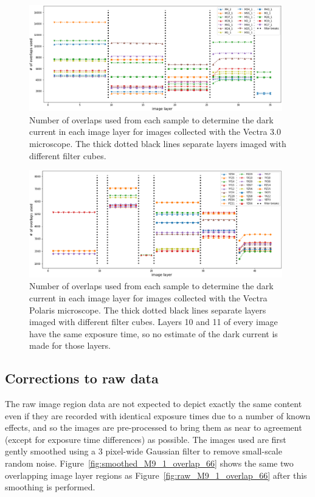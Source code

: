 \documentclass[letterpaper,11pt]{article}
\newcommand{\reffig}[1]{Figure~\ref{#1}}
\begin{document}
\begin{figure}[!ht]
\centering
\includegraphics[width=0.98\textwidth]{images/methods/n_overlaps_used_vectra}
\caption{\footnotesize Number of overlaps used from each sample to determine the dark current in each image layer for images collected with the Vectra 3.0 microscope. The thick dotted black lines separate layers imaged with different filter cubes.}
\label{fig:n_overlaps_used_vectra}
\end{figure}

\begin{figure}[!ht]
\centering
\includegraphics[width=0.98\textwidth]{images/methods/n_overlaps_used_polaris}
\caption{\footnotesize Number of overlaps used from each sample to determine the dark current in each image layer for images collected with the Vectra Polaris microscope. The thick dotted black lines separate layers imaged with different filter cubes. Layers 10 and 11 of every image have the same exposure time, so no estimate of the dark current is made for those layers. }
\label{fig:n_overlaps_used_polaris}
\end{figure}

\subsection{Corrections to raw data}
\label{ssec:corrections_to_raw_data}

The raw image region data are not expected to depict exactly the same content even if they are recorded with identical exposure times due to a number of known effects, and so the images are pre-processed to bring them as near to agreement (except for exposure time differences) as possible. The images used are first gently smoothed using a 3 pixel-wide Gaussian filter to remove small-scale random noise. \reffig{fig:smoothed_M9_1_overlap_66} shows the same two overlapping image layer regions as \reffig{fig:raw_M9_1_overlap_66} after this smoothing is performed.
\end{document}
